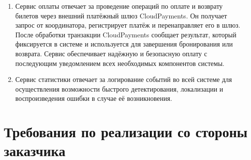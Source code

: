 \begin{enumerate}
    Выбор времени жизни кеша зависит от специфики авиаданных. 
    В нашем сценарии устанавливается TTL кеша равный 15 минутам. 
    Это означает, что результаты запроса к Aviasales будут сохраняться в Redis в течение 15 минут, что позволяет существенно снизить нагрузку на внешний API при повторных запросах от пользователей. 
    При этом, поскольку динамические данные (например, цены, наличие мест или актуальный статус рейса) могут изменяться даже в пределах этого интервала, в процессе оформления билета проводится финальная проверка: перед бронированием сервис всегда обращается к API Aviasales для уточнения и обновления динамических параметров. 
    Таким образом, даже если пользователь изначально получил результаты из кеша, актуальность данных гарантируется за счёт дополнительного запроса при покупке, что обеспечивает баланс между быстродействием (благодаря Redis-кешированию) и точностью предоставляемой информации.

    О каждом рейсе хранится следующая информация:
    \begin{itemize}
        \item уникальный а рамках системы идентификатор рейса;
        \item дата полёта;
        \item аэропорт отправления;
        \item аэропорт назначения;
        \item цена рейса.
    \end{itemize}

    \item Сервис оплаты отвечает за проведение операций по оплате и возврату билетов через внешний платёжный шлюз CloudPayments. Он получает запрос от координатора, регистрирует платёж и перенаправляет его в шлюз. После обработки транзакции CloudPayments сообщает результат, который фиксируется в системе и используется для завершения бронирования или возврата. Сервис обеспечивает надёжную и безопасную оплату с последующим уведомлением всех необходимых компонентов системы.
    
    \item Сервис статистики отвечает за логирование событий во всей системе для осуществления возможности быстрого детектирования, локализации и воспроизведения ошибки в случае её возникновения. 
\end{enumerate}

\section*{Требования по реализации со стороны заказчика}

